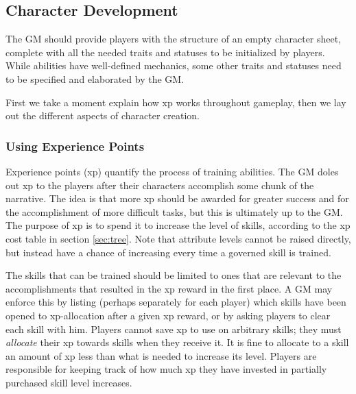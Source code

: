 \documentclass[12pt]{article}
\begin{document}
\subsection{Character Development}\label{sec:dev}

The GM should provide players with the structure of an empty character sheet,
complete with all the needed traits and statuses to be initialized by players.
While abilities have well-defined mechanics, some other traits and statuses
need to be specified and elaborated by the GM.

First we take a moment explain how xp works throughout gameplay,
then we lay out the different aspects of character creation.

\subsubsection{Using Experience Points}
Experience points (xp) quantify the process of training abilities.
The GM doles out xp to the players after their characters accomplish some chunk of the narrative.
The idea is that more xp should be awarded for greater success and for the accomplishment of more difficult tasks,
but this is ultimately up to the GM.
The purpose of xp is to spend it to increase the level of skills, according to the xp cost table in section \ref{sec:tree}.
Note that attribute levels cannot be raised directly, but instead have a chance of increasing every time a governed skill is trained.

The skills that can be trained should be limited to ones that are relevant to the accomplishments that resulted in the xp reward in the first place.
A GM may enforce this by listing 
(perhaps separately for each player)
which skills have been opened
to xp-allocation after a given xp reward,
or by asking players to clear each skill with him.
Players cannot save xp to use on arbitrary skills; they must \emph{allocate} their xp towards skills when they receive it.
It is fine to allocate to a skill an amount of xp less than what is needed to increase its level.
Players are responsible for keeping track of how much xp they have invested in partially purchased skill level increases.
\end{document}
